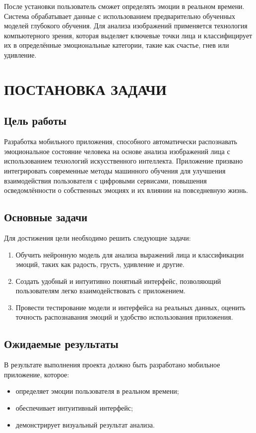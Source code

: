 {{        После установки пользователь сможет определять эмоции в реальном времени. Система обрабатывает данные с использованием предварительно обученных моделей глубокого обучения. Для анализа изображений применяется технология компьютерного зрения, которая выделяет ключевые точки лица и классифицирует их в определённые эмоциональные категории, такие как счастье, гнев или удивление.

    }
    \newpage

\newpage

\section{\MakeUppercase{Постановка задачи}}


\subsection*{Цель работы}
Разработка мобильного приложения, способного автоматически распознавать эмоциональное состояние человека на основе анализа изображений лица с использованием технологий искусственного интеллекта. Приложение призвано интегрировать современные методы машинного обучения для улучшения взаимодействия пользователя с цифровыми сервисами, повышения осведомлённости о собственных эмоциях и их влиянии на повседневную жизнь.

\subsection*{Основные задачи}
Для достижения цели необходимо решить следующие задачи:
\begin{enumerate}
    \item Обучить нейронную модель для анализа выражений лица и классификации эмоций, таких как радость, грусть, удивление и другие.
    \item Создать удобный и интуитивно понятный интерфейс, позволяющий пользователям легко взаимодействовать с приложением.
    \item Провести тестирование модели и интерфейса на реальных данных, оценить точность распознавания эмоций и удобство использования приложения.
\end{enumerate}

\subsection*{Ожидаемые результаты}
В результате выполнения проекта должно быть разработано мобильное приложение, которое:
\begin{itemize}
    \item определяет эмоции пользователя в реальном времени;
    \item обеспечивает интуитивный интерфейс;
    \item демонстрирует визуальный результат анализа.
\end{itemize}

}
